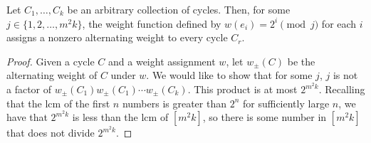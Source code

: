		\begin{fprop}
			Let $C_1,\ldots,C_k$ be an arbitrary collection of cycles. Then, for some $j \in \{1,2,\ldots,m^2k\}$, the weight function defined by $w(e_i) = 2^i \pmod j$ for each $i$ assigns a nonzero alternating weight to every cycle $C_r$.
		\end{fprop}
		\begin{proof}
			Given a cycle $C$ and a weight assignment $w$, let $w_{\pm}(C)$ be the alternating weight of $C$ under $w$. We would like to show that for some $j$, $j$ is not a factor of $w_{\pm}(C_1) w_{\pm}(C_1) \cdots w_{\pm}(C_k)$. This product is at most $2^{m^2k}$. Recalling that the lcm of the first $n$ numbers is greater than $2^n$ for sufficiently large $n$, we have that $2^{m^2k}$ is less than the lcm of $[m^2k]$, so there is some number in $[m^2k]$ that does not divide $2^{m^2k}$.
		\end{proof}

